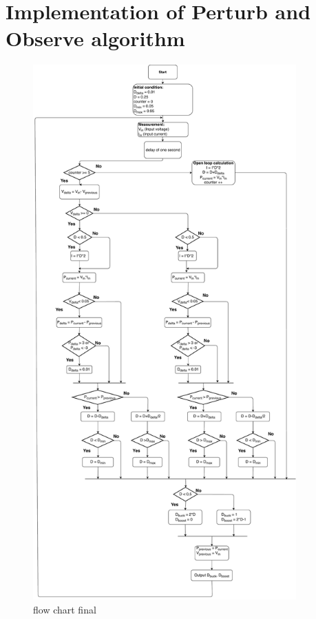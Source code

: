 \section{Implementation of Perturb and Observe algorithm}\label{MPPTImplementation}

\begin{figure}[htbp]
	\begin{center}
		\includegraphics[width=0.9\textwidth]{../Pictures/2018_11_14_Flow_chart_MPPT_Buck-Boost_converter}
		\caption{flow chart final }
		\label{fcfinal}
	\end{center}	
\end{figure}

